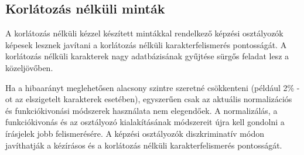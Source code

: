\subsection{Korlátozás nélküli minták}
A korlátozás nélküli kézzel készített mintákkal rendelkező képzési osztályozók képesek lesznek javítani a korlátozás nélküli karakterfelismerés pontosságát. A korlátozás nélküli karakterek nagy adatbázisának gyűjtése sürgős feladat lesz a közeljövőben.

Ha a hibaarányt meglehetősen alacsony szintre szeretné csökkenteni (például 2\% -ot az elszigetelt karakterek esetében), egyszerűen csak az aktuális normalizációs és funkciókivonási módszerek használata nem elegendőek. A normalizálás, a funkciókivonás és az osztályozó kialakításának módszereit újra kell gondolni a írásjelek jobb felismerésére. A képzési osztályozók diszkriminatív módon javíthatják a kézírásos és a korlátozás nélküli karakterfelismerés pontosságát.